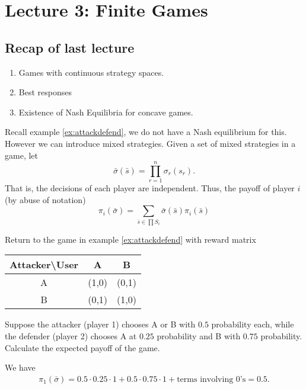 \section{Lecture 3: Finite Games}
\newsection
\subsection*{Recap of last lecture}
\begin{enumerate}
    \item Games with continuous strategy spaces.
    \item Best responses
    \item Existence of Nash Equilibria for concave games.
\end{enumerate}

Recall example \ref{ex:attackdefend}, we do not have a Nash equilibrium for this. However we can introduce mixed strategies.
Given a set of mixed strategies in a game, let \[
    \bar{\sigma}(\bar{s}) = \prod_{r=1}^{n}\sigma_r(s_r).\]
That is, the decisions of each player are independent.
Thus, the payoff of player $i$ (by abuse of notation)\[
\pi_i(\bar{\sigma})=\sum_{\bar{s}\in \prod S_i} \bar{\sigma}(\bar{s})\pi_i(\bar{s})
\]
\begin{aexample}{}{}%
    Return to the game in example \ref{ex:attackdefend} with reward matrix
    \begin{center}
        \begin{tabular}{|c|c c|} 
            \hline
            Attacker\textbackslash User & A&B \\ 
            \hline
            A & (1,0) & (0,1)\\ 
            \hline
            B & (0,1)&(1,0)\\
            \hline
        \end{tabular}
    \end{center}
    Suppose the attacker (player 1) chooses A or B with $0.5$ probability each, while the defender (player 2) chooses A at $0.25$ probability and B with $0.75$ probability.
    Calculate the expected payoff of the game.
\end{aexample}
We have\begin{align*}
    \pi_1(\bar{\sigma}) = 0.5\cdot 0.25 \cdot 1 + 0.5\cdot 0.75\cdot 1 + \textrm{terms involving $0$'s} = 0.5.
\end{align*}

